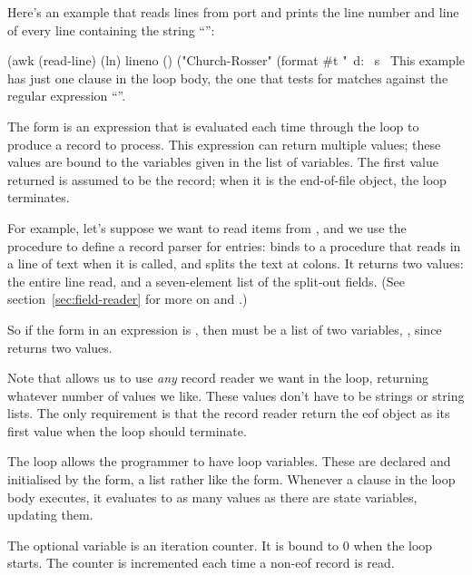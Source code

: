 Here's an example that reads lines from port 
and prints the line number and line of every line containing the
string ``'':
\begin{code}
(awk (read-line) (ln) lineno ()
  ("Church-Rosser" (format #t "~d: ~s~%
This example has just one clause in the loop body, the one that
tests for matches against the regular expression ``''.

The  form is an expression that is evaluated each time 
through the loop to produce a record to process.
This expression can return multiple values;
these values are bound to the variables given in the 
 list of variables.
The first value returned is assumed to be the record;
when it is the end-of-file object, the loop terminates.

For example, let's suppose we want to read items from ,
and we use the  procedure to define a record parser for
 entries:
binds  to a procedure that reads in a line of text when
it is called, and splits the text at colons. It returns two values: 
the entire line read, and a seven-element list of the split-out fields.
(See section~\ref{sec:field-reader} for more on  and 
.)

So if the  form in an  expression is 
, then  must be a list of
two variables, \eg,
since  returns two values.

Note that  allows us to use \emph{any} record reader we want in the
loop, returning whatever number of values we like. These values
don't have to be strings or string lists. The only requirement
is that the record reader return the eof object as its first value
when the loop should terminate.

The  loop allows the programmer to have loop variables. These are
declared and initialised by the  form, a
list rather like the  form. Whenever a clause in the loop body
executes, it evaluates to as many values as there are state variables,
updating them.

The optional  variable is an iteration counter. 
It is bound to 0 when the loop starts. 
The counter is incremented each time a non-eof record is read.


\end{code}

